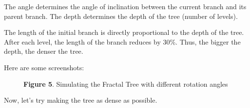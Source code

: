 \documentclass{resonance}
\begin{document}
The angle determines the angle of inclination between the current branch and its parent branch. The depth determines the depth of the tree (number of levels).

The length of the initial branch is directly proportional to the depth of the tree. After each level, the length of the branch reduces by 30\%. Thus, the bigger the depth, the denser the tree.

Here are some screenshots:

\pagebreak

\begin{figure}[ht]

\vspace{10pt}
\hspace{-10pt}\scriptsize{\textbf{Figure 5}. \normalfont Simulating the Fractal Tree with different rotation angles}
\end{figure}

\setlength{\leftskip}{-0cm}
Now, let's try making the tree as dense as possible.\\
\end{document}
